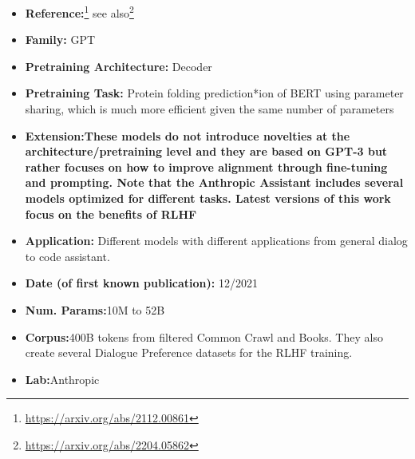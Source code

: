 \documentclass{article}
\begin{document}
            \begin{itemize}
                \item \textbf{Reference:}\footnote{\url{https://arxiv.org/abs/2112.00861}} see also\footnote{\url{https://arxiv.org/abs/2204.05862}} \cite{bai2022training,askell2021general}
                \item \textbf{Family:} GPT 
                \item \textbf{Pretraining Architecture:} Decoder
                \item \textbf{Pretraining Task:} Protein folding prediction*ion of BERT using parameter sharing, which is much more efficient given the same number of parameters
                \item \textbf{Extension:These models do not introduce novelties at the architecture/pretraining level and they are based on GPT-3 but rather focuses on how to improve alignment through fine-tuning and prompting. Note that the Anthropic Assistant includes several models optimized for different tasks. Latest versions of this work focus on the benefits of RLHF}   
                \item \textbf{Application:} Different models with different applications from general dialog to code assistant.
                \item \textbf{Date (of first known publication):} 12/2021
                \item \textbf{Num. Params:}10M to 52B
                \item \textbf{Corpus:}400B tokens from filtered Common Crawl and Books. They also create several Dialogue Preference datasets for the RLHF training.
                \item \textbf{Lab:}Anthropic
            \end{itemize}
\end{document}
